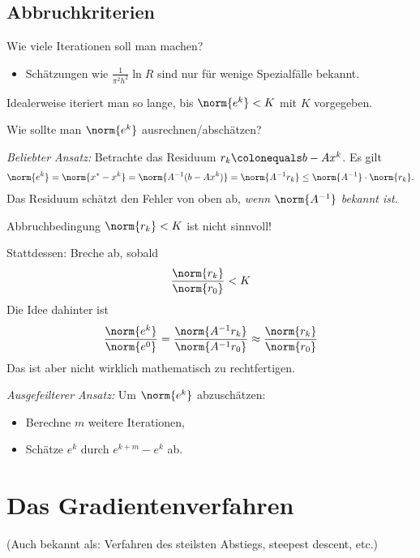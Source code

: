 \subsection{Abbruchkriterien}
Wie viele Iterationen soll man machen?
\begin{itemize}
 \item Schätzungen wie \glqq $\frac{1}{\pi^2 h^2} \ln R$\grqq{} sind nur für wenige
   Spezialfälle bekannt.
\end{itemize}


Idealerweise iteriert man so lange, bis $\norm{e^k} <K$ mit $K$ vorgegeben.

\medskip

Wie sollte man $\norm{e^k}$ ausrechnen/abschätzen?

\medskip

\emph{Beliebter Ansatz:} Betrachte das Residuum $r_k \colonequals b-Ax^k$. Es gilt
\begin{align*}
 \norm{e^k} = \norm{x^*-x^k} = \norm{ A^{-1} (b-Ax^k)} = \norm{A^{-1}r_k}
  \leq
 \norm{A^{-1}} \cdot \norm{r_k}.
\end{align*}
Das Residuum schätzt den Fehler von oben ab, \emph{wenn $\norm{A^{-1}}$ bekannt ist}.

Abbruchbedingung $\norm{r_k} < K$ ist nicht sinnvoll!

Stattdessen: Breche ab, sobald
\begin{equation*}
 \frac{\norm{r_k}}{\norm{r_0}}<K
\end{equation*}
Die Idee dahinter ist
\begin{equation*}
 \frac{\norm{e^k}}{\norm{e^0}} = \frac{\norm{A^{-1}r_k}}{\norm{A^{-1}r_0}}
  \approx
 \frac{\norm{r_k}}{\norm{r_0}}
\end{equation*}
Das ist aber nicht wirklich mathematisch zu rechtfertigen.

\medskip

\emph{Ausgefeilterer Ansatz:}  Um $\norm{e^k}$ abzuschätzen:
\begin{itemize}
 \item Berechne $m$ weitere Iterationen,
 \item Schätze $e^k$ durch $e^{k+m} - e^k$ ab.
\end{itemize}


\section{Das Gradientenverfahren}

(Auch bekannt als: Verfahren des steilsten Abstiegs, steepest descent, etc.)

